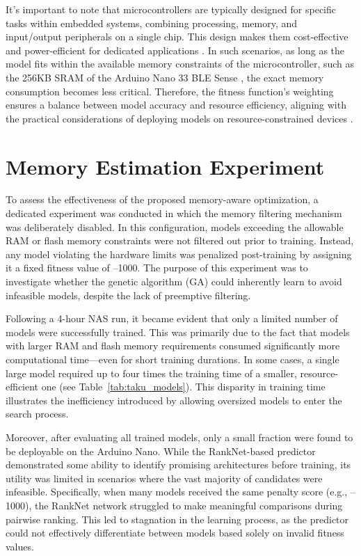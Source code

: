 It's important to note that microcontrollers are typically designed for specific tasks within embedded systems, combining processing, memory, and input/output peripherals on a single chip. This design makes them cost-effective and power-efficient for dedicated applications . In such scenarios, as long as the model fits within the available memory constraints of the microcontroller, such as the 256KB SRAM of the Arduino Nano 33 BLE Sense , the exact memory consumption becomes less critical. Therefore, the fitness function's weighting ensures a balance between model accuracy and resource efficiency, aligning with the practical considerations of deploying models on resource-constrained devices \cite{arduino_nano33ble}.



\section{Memory Estimation Experiment}
\label{sec:memory_estimation_experiment}
To assess the effectiveness of the proposed memory-aware optimization, a dedicated experiment was conducted in which the memory filtering mechanism was deliberately disabled. In this configuration, models exceeding the allowable RAM or flash memory constraints were not filtered out prior to training. Instead, any model violating the hardware limits was penalized post-training by assigning it a fixed fitness value of –1000. The purpose of this experiment was to investigate whether the genetic algorithm (GA) could inherently learn to avoid infeasible models, despite the lack of preemptive filtering.

Following a 4-hour NAS run, it became evident that only a limited number of models were successfully trained. This was primarily due to the fact that models with larger RAM and flash memory requirements consumed significantly more computational time—even for short training durations. In some cases, a single large model required up to four times the training time of a smaller, resource-efficient one (see Table~\ref{tab:taku_models}). This disparity in training time illustrates the inefficiency introduced by allowing oversized models to enter the search process.

Moreover, after evaluating all trained models, only a small fraction were found to be deployable on the Arduino Nano. While the RankNet-based predictor demonstrated some ability to identify promising architectures before training, its utility was limited in scenarios where the vast majority of candidates were infeasible. Specifically, when many models received the same penalty score (e.g., –1000), the RankNet network struggled to make meaningful comparisons during pairwise ranking. This led to stagnation in the learning process, as the predictor could not effectively differentiate between models based solely on invalid fitness values.

